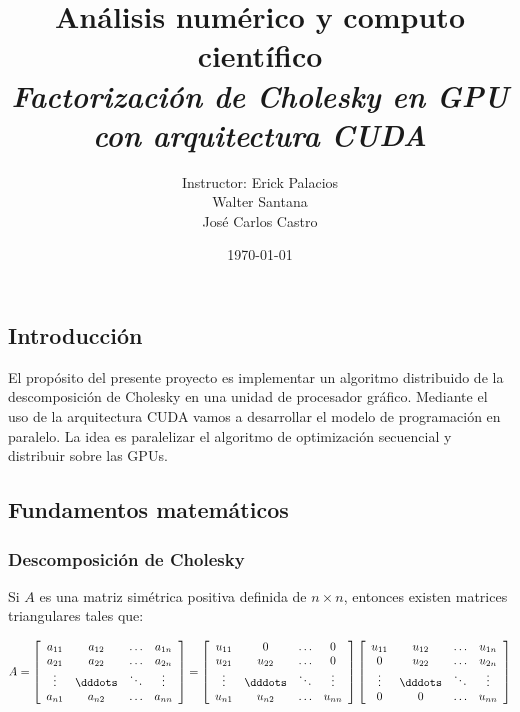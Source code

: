 \documentclass[12pt]{article}
\begin{document}
\title{\textbf{Análisis numérico y computo científico} \\
\textit{Factorización de Cholesky en GPU con arquitectura CUDA}}
\author{Instructor: Erick Palacios \\ Walter Santana \\ José Carlos Castro}
\date{\today}
\maketitle


\subsection*{Introducci\'on}
El propósito del presente proyecto es implementar un algoritmo distribuido de la descomposición de Cholesky en una unidad de procesador gráfico. Mediante el uso de la arquitectura CUDA vamos a desarrollar el modelo de programación en paralelo. La idea es paralelizar el algoritmo de optimización secuencial y distribuir sobre las GPUs.  

\subsection*{Fundamentos matem\'aticos}
\subsubsection*{Descomposici\'on de Cholesky}
 
 Si $A$ es una matriz simétrica positiva definida de $n \times n$, entonces existen matrices triangulares tales que:

\[
   A = \left [ \begin{array}{cccc} a_{11} & a_{12} & \hdots & a_{1n} \\
                                  a_{21} & a_{22} & \hdots & a_{2n} \\
                                  \vdots & \dddots & \ddots & \vdots \\
                                  a_{n1} & a_{n2} & \hdots & a_{nn}              
                   \end{array} 
            \right ] = \left [ \begin{array}{cccc} u_{11} & 0 & \hdots & 0 \\
                                  u_{21} & u_{22} & \hdots & 0 \\
                                  \vdots & \dddots & \ddots & \vdots \\
                                  u_{n1} & u_{n2} & \hdots & u_{nn}              
                   \end{array} 
            \right ]  \left [ \begin{array}{cccc} u_{11} & u_{12} & \hdots & u_{1n} \\
                                  0 & u_{22} & \hdots & u_{2n} \\
                                  \vdots & \dddots & \ddots & \vdots \\
                                  0 & 0 & \hdots & u_{nn}              
                   \end{array} 
            \right ]       
\]
\end{document}
